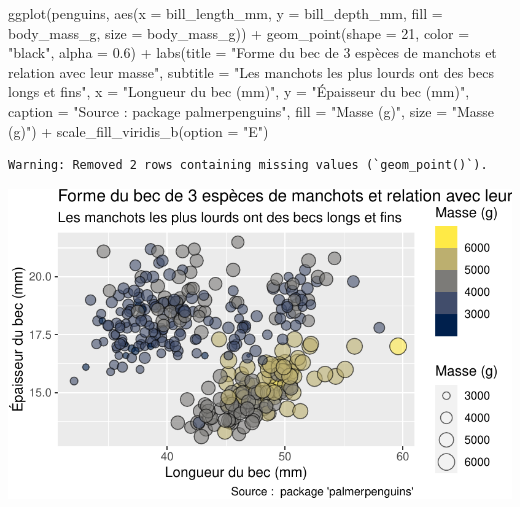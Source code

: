 \documentclass[
  a4paper,
  DIV=11,
  numbers=noendperiod,
  oneside]{scrreprt}
\newenvironment{Shaded}{}{}
\newcommand{\AttributeTok}[1]{\textcolor[rgb]{0.84,0.23,0.29}{#1}}
\newcommand{\DecValTok}[1]{\textcolor[rgb]{0.00,0.36,0.77}{#1}}
\newcommand{\FloatTok}[1]{\textcolor[rgb]{0.00,0.36,0.77}{#1}}
\newcommand{\FunctionTok}[1]{\textcolor[rgb]{0.44,0.26,0.76}{#1}}
\newcommand{\NormalTok}[1]{\textcolor[rgb]{0.14,0.16,0.18}{#1}}
\newcommand{\SpecialCharTok}[1]{\textcolor[rgb]{0.00,0.36,0.77}{#1}}
\newcommand{\StringTok}[1]{\textcolor[rgb]{0.01,0.18,0.38}{#1}}
\begin{document}
\begin{Shaded}
\begin{Highlighting}[]
\FunctionTok{ggplot}\NormalTok{(penguins, }\FunctionTok{aes}\NormalTok{(}\AttributeTok{x =}\NormalTok{ bill\_length\_mm, }\AttributeTok{y =}\NormalTok{ bill\_depth\_mm,}
                     \AttributeTok{fill =}\NormalTok{ body\_mass\_g, }\AttributeTok{size =}\NormalTok{ body\_mass\_g)) }\SpecialCharTok{+}
  \FunctionTok{geom\_point}\NormalTok{(}\AttributeTok{shape =} \DecValTok{21}\NormalTok{, }\AttributeTok{color =} \StringTok{"black"}\NormalTok{, }\AttributeTok{alpha =} \FloatTok{0.6}\NormalTok{) }\SpecialCharTok{+}
  \FunctionTok{labs}\NormalTok{(}\AttributeTok{title =} \StringTok{"Forme du bec de 3 espèces de manchots et relation avec leur masse"}\NormalTok{,}
       \AttributeTok{subtitle =} \StringTok{"Les manchots les plus lourds ont des becs longs et fins"}\NormalTok{,}
       \AttributeTok{x =} \StringTok{"Longueur du bec (mm)"}\NormalTok{,}
       \AttributeTok{y =} \StringTok{"Épaisseur du bec (mm)"}\NormalTok{,}
       \AttributeTok{caption =} \StringTok{"Source :  package \textquotesingle{}palmerpenguins\textquotesingle{}"}\NormalTok{,}
       \AttributeTok{fill =} \StringTok{"Masse (g)"}\NormalTok{,}
       \AttributeTok{size =} \StringTok{"Masse (g)"}\NormalTok{) }\SpecialCharTok{+}
  \FunctionTok{scale\_fill\_viridis\_b}\NormalTok{(}\AttributeTok{option =} \StringTok{"E"}\NormalTok{)}
\end{Highlighting}
\end{Shaded}

\begin{verbatim}
Warning: Removed 2 rows containing missing values (`geom_point()`).
\end{verbatim}

\includegraphics{03-visualization_files/figure-pdf/unnamed-chunk-94-1.pdf}
\end{document}
